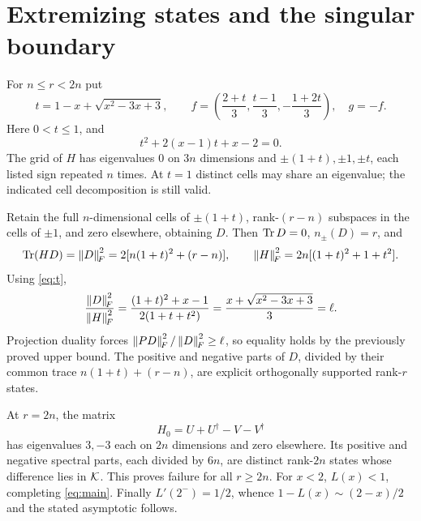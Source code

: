 \documentclass[11pt,a4paper]{article}
\theoremstyle{remark}\newtheorem{remark}[theorem]{Remark}
\begin{document}
\section{Extremizing states and the singular boundary}
For $n\le r<2n$ put
\[
 t=1-x+\sqrt{x^2-3x+3},\qquad
 f=\left(\frac{2+t}3,\frac{t-1}3,-\frac{1+2t}3\right),\quad g=-f .
\]
Here $0<t\le1$, and
\begin{equation}\label{eq:t}
 t^2+2(x-1)t+x-2=0.
\end{equation}
The grid of $H$ has eigenvalues $0$ on $3n$ dimensions and
$\pm(1+t),\pm1,\pm t$, each listed sign repeated $n$ times.
At $t=1$ distinct cells may share an eigenvalue; the indicated cell
decomposition is still valid.

Retain the full $n$-dimensional cells of $\pm(1+t)$, rank-$(r-n)$
subspaces in the cells of $\pm1$, and zero elsewhere, obtaining $D$.
Then $\operatorname{Tr} D=0$, $n_\pm(D)=r$, and
\[
 \operatorname{Tr}(HD)=\left\|D\right\|_{\!F}^2=2[n(1+t)^2+(r-n)],\qquad
 \left\|H\right\|_{\!F}^2=2n[(1+t)^2+1+t^2].
\]
Using \eqref{eq:t},
\[
 \frac{\left\|D\right\|_{\!F}^2}{\left\|H\right\|_{\!F}^2}
 =\frac{(1+t)^2+x-1}{2(1+t+t^2)}
 =\frac{x+\sqrt{x^2-3x+3}}3=\ell.
\]
Projection duality forces $\left\|PD\right\|_{\!F}^2/\left\|D\right\|_{\!F}^2\ge\ell$, so equality
holds by the previously proved upper bound. The positive and negative
parts of $D$, divided by their common trace $n(1+t)+(r-n)$, are
explicit orthogonally supported rank-$r$ states.

At $r=2n$, the matrix
\[
 H_0=U+U^\dagger-V-V^\dagger
\]
has eigenvalues $3,-3$ each on $2n$ dimensions and zero elsewhere.
Its positive and negative spectral parts, each divided by $6n$, are
distinct rank-$2n$ states whose difference lies in $\mathcal K$. This proves
failure for all $r\ge2n$. For $x<2$, $L(x)<1$, completing
\eqref{eq:main}. Finally $L'(2^-)=1/2$, whence
$1-L(x)\sim(2-x)/2$ and the stated asymptotic follows.
\end{document}
